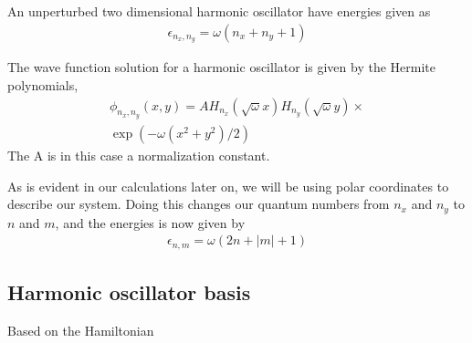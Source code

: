 \documentclass[11pt]{article}
\begin{document}
An unperturbed two dimensional harmonic oscillator have energies given as
\begin{align}
	\epsilon_{n_x,n_y} = \omega(n_x + n_y + 1)
	\label{eq:ho-energy-cartesian}
\end{align}

The wave function solution for a harmonic oscillator is given by the Hermite polynomials,
\begin{align}
	\phi_{n_x,n_y}(x,y) = AH_{n_x}(\sqrt{\omega}x)H_{n_y}(\sqrt{\omega}y)\times \nonumber \\
	\exp(-\omega(x^2 + y^2)/2)
\end{align}
The A is in this case a normalization constant.

As is evident in our calculations later on, we will be using polar coordinates to describe our system. Doing this changes our quantum numbers from $n_x$ and $n_y$ to $n$ and $m$, and the energies is now given by
\begin{align}
	\epsilon_{n, m} = \omega(2n + |m| + 1)
	\label{eq:ho-energy-polar}
\end{align}

\subsection{Harmonic oscillator basis}
Based on the Hamiltonian
\end{document}
